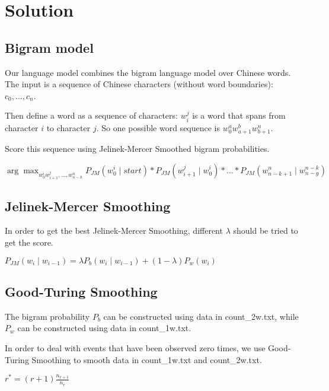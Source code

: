 \documentclass{article}
\begin{document}
\section{Solution}

\subsection{Bigram model}
Our language model combines the bigram language model over Chinese words. The input is a sequence of Chinese characters (without word boundaries): $c_0,..., c_n$.

Then define a word as a sequence of characters: $w_i^j$ is a word that spans from character $i$ to character $j$. So one possible word sequence is $w_0^aw_{a+1}^bw_{b+1}^n$. 

\vspace{5pt} 

Score this sequence using Jelinek-Mercer Smoothed bigram probabilities.

\begin{center} $\arg\max_{w_0^iw_{i+1}^j,...,w_{n-k}^n} P_{JM}( w_0^i \mid start) * P_{JM}(w_{i+1}^j \mid w_0^i) * ... * P_{JM}(w_{n-k + 1}^n \mid w_{n-g}^{n-k})$ \end{center}

\subsection{Jelinek-Mercer Smoothing}

In order to get the best Jelinek-Mercer Smoothing, different $\lambda$ should be tried to get the score.
\begin{center} $P_{JM}(w_i \mid w_{i-1}) = \lambda P_b(w_i \mid w_{i-1}) + (1-\lambda)P_w(w_i)$ \end{center}

\subsection{Good-Turing Smoothing}

The bigram probability $P_b$ can be constructed using data in count\_2w.txt, while $P_w$ can be constructed using data in count\_1w.txt.

In order to deal with events that have been observed zero times, we use Good-Turing Smoothing to smooth data in count\_1w.txt and count\_2w.txt.

\begin{center} $r^* = (r + 1) \frac{n_{r+1}}{n_r}$ \end{center}
\end{document}
